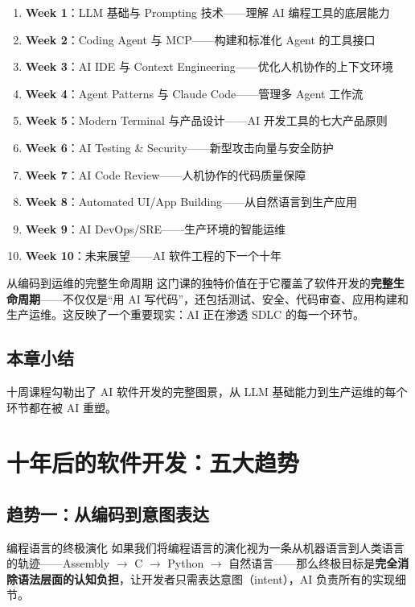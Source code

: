 \documentclass[a4paper]{article}
\begin{document}
\begin{enumerate}
    \item \textbf{Week 1}：LLM 基础与 Prompting 技术——理解 AI 编程工具的底层能力
    \item \textbf{Week 2}：Coding Agent 与 MCP——构建和标准化 Agent 的工具接口
    \item \textbf{Week 3}：AI IDE 与 Context Engineering——优化人机协作的上下文环境
    \item \textbf{Week 4}：Agent Patterns 与 Claude Code——管理多 Agent 工作流
    \item \textbf{Week 5}：Modern Terminal 与产品设计——AI 开发工具的七大产品原则
    \item \textbf{Week 6}：AI Testing \& Security——新型攻击向量与安全防护
    \item \textbf{Week 7}：AI Code Review——人机协作的代码质量保障
    \item \textbf{Week 8}：Automated UI/App Building——从自然语言到生产应用
    \item \textbf{Week 9}：AI DevOps/SRE——生产环境的智能运维
    \item \textbf{Week 10}：未来展望——AI 软件工程的下一个十年
\end{enumerate}

\begin{knowledgebox}{从编码到运维的完整生命周期}
这门课的独特价值在于它覆盖了软件开发的\textbf{完整生命周期}——不仅仅是``用 AI 写代码''，还包括测试、安全、代码审查、应用构建和生产运维。这反映了一个重要现实：AI 正在渗透 SDLC 的每一个环节。
\end{knowledgebox}

\subsection{本章小结}

十周课程勾勒出了 AI 软件开发的完整图景，从 LLM 基础能力到生产运维的每个环节都在被 AI 重塑。

\section{十年后的软件开发：五大趋势}

\subsection{趋势一：从编码到意图表达}

\begin{importantbox}{编程语言的终极演化}
如果我们将编程语言的演化视为一条从机器语言到人类语言的轨迹——Assembly $\rightarrow$ C $\rightarrow$ Python $\rightarrow$ 自然语言——那么终极目标是\textbf{完全消除语法层面的认知负担}，让开发者只需表达意图（intent），AI 负责所有的实现细节。
\end{importantbox}
\end{document}
